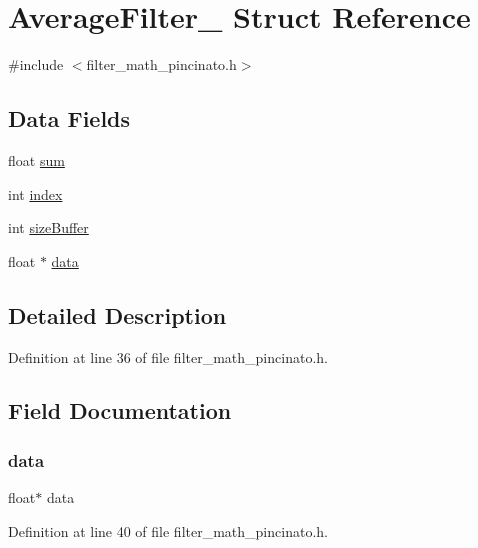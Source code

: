 \hypertarget{struct_average_filter__}{}\section{Average\+Filter\+\_\+ Struct Reference}
\label{struct_average_filter__}


{\ttfamily \#include $<$filter\+\_\+math\+\_\+pincinato.\+h$>$}

\subsection*{Data Fields}
\begin{DoxyCompactItemize}
\item 
float \mbox{\hyperlink{struct_average_filter___aeeafe7e9eebbd2a45ce4fa2ae0d96c51}{sum}}
\item 
int \mbox{\hyperlink{struct_average_filter___a750b5d744c39a06bfb13e6eb010e35d0}{index}}
\item 
int \mbox{\hyperlink{struct_average_filter___a145948232f729807d798ee4339711815}{size\+Buffer}}
\item 
float $\ast$ \mbox{\hyperlink{struct_average_filter___a57ba9c584cf7756552b7d4370e93395f}{data}}
\end{DoxyCompactItemize}


\subsection{Detailed Description}


Definition at line 36 of file filter\+\_\+math\+\_\+pincinato.\+h.



\subsection{Field Documentation}
\mbox{\label{struct_average_filter___a57ba9c584cf7756552b7d4370e93395f}} 
\subsubsection{\texorpdfstring{data}{data}}
{\footnotesize\ttfamily float$\ast$ data}



Definition at line 40 of file filter\+\_\+math\+\_\+pincinato.\+h.

